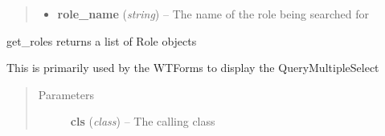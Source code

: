 \documentclass[letterpaper,10pt,english]{sphinxmanual}
\begin{document}
\begin{fulllineitems}
\begin{fulllineitems}
\begin{quote}
\begin{description}
\begin{itemize}
\item {} 
\textbf{role\_name} (\emph{string}) -- The name of the role being searched for

\end{itemize}

\end{description}\end{quote}

\end{fulllineitems}


\begin{fulllineitems}
\label{dev-users:cagenix.users.models.Role.get_roles}
get\_roles returns a list of Role objects

This is primarily used by the WTForms to display the QueryMultipleSelect
\begin{quote}\begin{description}
\item[{Parameters}] \leavevmode
\textbf{cls} (\emph{class}) -- The calling class

\end{description}\end{quote}

\end{fulllineitems}


\end{fulllineitems}

\end{document}
